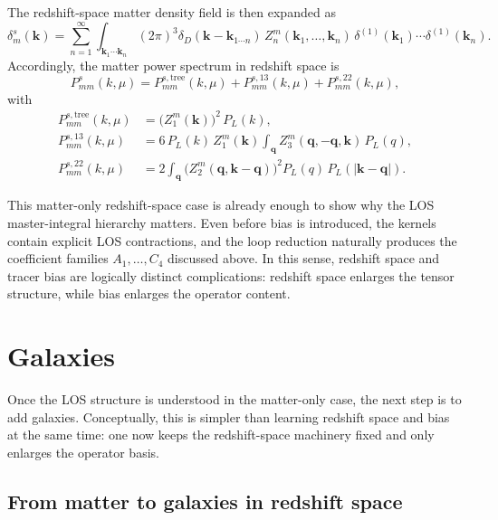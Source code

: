 \documentclass[a4paper,11pt]{article}
\newcommand{\vk}{\bm{k}}
\newcommand{\vq}{\bm{q}}
\newcommand{\<}{\langle}
\renewcommand{\>}{\rangle}
\begin{document}
The redshift-space matter density field is then expanded as
\begin{equation}
\delta_m^s(\vk)
=
\sum_{n=1}^{\infty}
\int_{\vk_1\cdots \vk_n}
(2\pi)^3\delta_D(\vk-\vk_{1\cdots n})
\,Z_n^m(\vk_1,\ldots,\vk_n)\,
\delta^{(1)}(\vk_1)\cdots \delta^{(1)}(\vk_n).
\label{eq:deltaMs_Zn_expansion}
\end{equation}
Accordingly, the matter power spectrum in redshift space is
\begin{equation}
P_{mm}^s(k,\mu)
=
P_{mm}^{s,\mathrm{tree}}(k,\mu)
+
P_{mm}^{s,13}(k,\mu)
+
P_{mm}^{s,22}(k,\mu),
\label{eq:Pmms_NLO}
\end{equation}
with
\begin{align}
P_{mm}^{s,\mathrm{tree}}(k,\mu)
&=
\bigl(Z_1^m(\vk)\bigr)^2\,P_L(k),
\label{eq:Pmm_tree_note}
\\
P_{mm}^{s,13}(k,\mu)
&=
6\,P_L(k)\,Z_1^m(\vk)
\int_{\vq} Z_3^m(\vq,-\vq,\vk)\,P_L(q),
\label{eq:Pmm_13_note}
\\
P_{mm}^{s,22}(k,\mu)
&=
2\int_{\vq}
\bigl(Z_2^m(\vq,\vk-\vq)\bigr)^2
P_L(q)\,P_L(|\vk-\vq|).
\label{eq:Pmm_22_note}
\end{align}

This matter-only redshift-space case is already enough to show why the LOS master-integral hierarchy matters. Even before bias is introduced, the kernels contain explicit LOS contractions, and the loop reduction naturally produces the coefficient families \(A_1,\ldots,C_4\) discussed above. In this sense, redshift space and tracer bias are logically distinct complications: redshift space enlarges the tensor structure, while bias enlarges the operator content.

\section{Galaxies}

Once the LOS structure is understood in the matter-only case, the next step is to add galaxies. Conceptually, this is simpler than learning redshift space and bias at the same time: one now keeps the redshift-space machinery fixed and only enlarges the operator basis.

\subsection{From matter to galaxies in redshift space}
\end{document}
